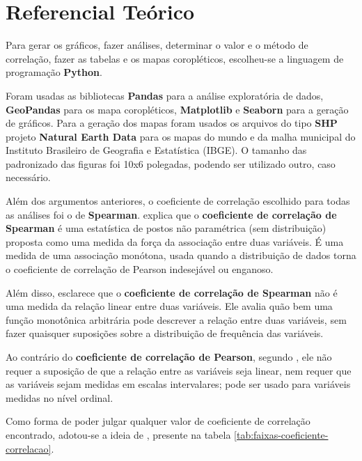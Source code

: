 \chapter{Referencial Teórico}

Para gerar os gráficos, fazer análises, determinar o valor e o método de correlação, fazer as tabelas e os mapas coropléticos, escolheu-se a linguagem de programação \textbf{Python}.

Foram usadas as bibliotecas \textbf{Pandas} para a análise exploratória de dados, \textbf{GeoPandas} para os mapa coropléticos, \textbf{Matplotlib} e \textbf{Seaborn} para a geração  de gráficos. Para a geração dos mapas foram usados os arquivos do tipo \textbf{SHP} projeto \textbf{Natural Earth Data} para os mapas do mundo e da malha municipal do Instituto Brasileiro de Geografia e Estatística (IBGE). O tamanho das padronizado das figuras foi 10x6 polegadas, podendo ser utilizado outro, caso necessário.

Além dos argumentos anteriores, o coeficiente de correlação escolhido para todas as análises foi o de \textbf{Spearman}. \cite{hauke2011comparison} explica que o \textbf{coeficiente de correlação de Spearman} é uma estatística de postos não paramétrica (sem distribuição) proposta como uma medida da força da associação entre duas variáveis. É uma medida de uma associação monótona, usada quando a distribuição de dados torna o coeficiente de correlação de Pearson indesejável ou enganoso. 

Além disso, \cite{hauke2011comparison} esclarece que o \textbf{coeficiente de correlação de Spearman} não é uma medida da relação linear entre duas variáveis. Ele avalia quão bem uma função monotônica arbitrária pode descrever a relação entre duas variáveis, sem fazer quaisquer suposições sobre a distribuição de frequência das variáveis.

Ao contrário do \textbf{coeficiente de correlação de Pearson}, segundo \cite{hauke2011comparison}, ele não requer a suposição de que a relação entre as variáveis seja linear, nem requer que as variáveis sejam medidas em escalas intervalares; pode ser usado para variáveis medidas no nível ordinal.

Como forma de poder julgar qualquer valor de coeficiente de correlação encontrado, adotou-se a ideia de \cite{ali2022spearman}, presente na tabela \ref{tab:faixas-coeficiente-correlacao}.

